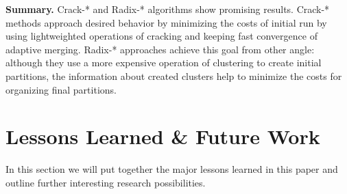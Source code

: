 \documentclass[10pt, conference, compsocconf]{IEEEtran}
\begin{document}
\textbf{Summary.} Crack-* and Radix-* algorithms show promising results. Crack-* methods approach desired behavior by minimizing the costs of initial run by using lightweighted operations of cracking and keeping fast convergence of adaptive merging. Radix-* approaches achieve this goal from other angle: although they use a more expensive operation of clustering to create initial partitions, the information about created clusters help to minimize the costs for organizing final partitions.

\section{Lessons Learned \& Future Work}
\label{sec:eval}
In this section we will put together the major lessons learned in this paper and outline further interesting research possibilities.
\end{document}

